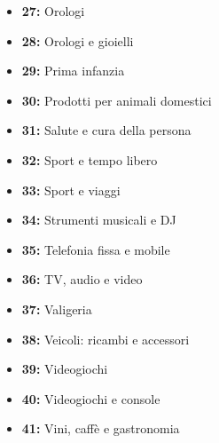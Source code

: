 \begin{itemize}
\item \textbf{27:} Orologi
\item \textbf{28:} Orologi e gioielli
\item \textbf{29:} Prima infanzia
\item \textbf{30:} Prodotti per animali domestici
\item \textbf{31:} Salute e cura della persona
\item \textbf{32:} Sport e tempo libero
\item \textbf{33:} Sport e viaggi
\item \textbf{34:} Strumenti musicali e DJ
\item \textbf{35:} Telefonia fissa e mobile
\item \textbf{36:} TV, audio e video
\item \textbf{37:} Valigeria
\item \textbf{38:} Veicoli: ricambi e accessori
\item \textbf{39:} Videogiochi
\item \textbf{40:} Videogiochi e console
\item \textbf{41:} Vini, caffè e gastronomia
\end{itemize}



